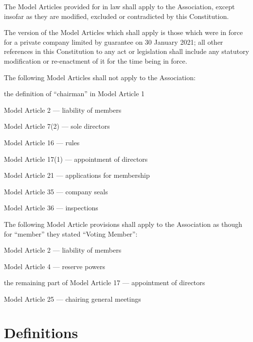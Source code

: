 \documentclass[12pt]{article}
\begin{document}
\begin{constenum}

\item The Model Articles provided for in law shall apply to the
  Association, except insofar as they are modified, excluded or
  contradicted by this Constitution.

\item The version of the Model Articles which shall apply is those
  which were in force for a private company limited by guarantee on
  30 January 2021; all other references in this Constitution
  to any act or legislation shall include any statutory modification
  or re-enactment of it for the time being in force.

\item The following Model Articles shall not apply to the Association:
  \begin{constenum}
  \item the definition of ``chairman'' in Model Article 1
  \item Model Article 2 --- liability of members
  \item Model Article 7(2) --- sole directors
  \item Model Article 16 --- rules
  \item Model Article 17(1) --- appointment of directors
  \item Model Article 21 --- applications for membership
  \item Model Article 35 --- company seals
  \item Model Article 36 --- inspections
  \end{constenum}

\item The following Model Article provisions shall apply to the Association
  as though for ``member'' they stated ``Voting Member'':

  \begin{constenum}
  \item Model Article 2 --- liability of members
  \item Model Article 4 --- reserve powers
  \item the remaining part of Model Article 17 --- appointment of directors
  \item Model Article 25 --- chairing general meetings
  \end{constenum}

\end{constenum}

\section{Definitions}
\end{document}
